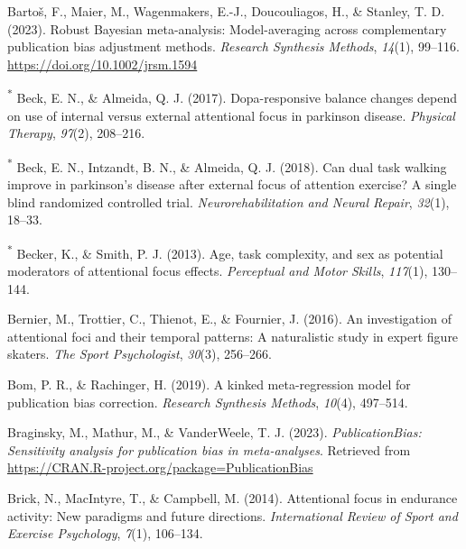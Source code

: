 \documentclass[
  man, donotrepeattitle,floatsintext]{apa7}
\newlength{\cslhangindent}
\newlength{\cslentryspacingunit} %
\newenvironment{CSLReferences}[2] %
 {%
  \setlength{\parindent}{0pt}
  \ifodd #1
  \let\oldpar\par
  \def\par{\hangindent=\cslhangindent\oldpar}
  \fi
  \setlength{\parskip}{#2\cslentryspacingunit}
 }%
 {}
\begin{document}
\begin{CSLReferences}{1}{0}
\leavevmode{}%
Bartoš, F., Maier, M., Wagenmakers, E.-J., Doucouliagos, H., \& Stanley, T. D. (2023). Robust {Bayesian} meta-analysis: {Model-averaging} across complementary publication bias adjustment methods. \emph{Research Synthesis Methods}, \emph{14}(1), 99--116. \url{https://doi.org/10.1002/jrsm.1594}

\leavevmode{}%
\textsuperscript{*} Beck, E. N., \& Almeida, Q. J. (2017). Dopa-responsive balance changes depend on use of internal versus external attentional focus in parkinson disease. \emph{Physical Therapy}, \emph{97}(2), 208--216.

\leavevmode{}%
\textsuperscript{*} Beck, E. N., Intzandt, B. N., \& Almeida, Q. J. (2018). Can dual task walking improve in parkinson's disease after external focus of attention exercise? A single blind randomized controlled trial. \emph{Neurorehabilitation and Neural Repair}, \emph{32}(1), 18--33.

\leavevmode{}%
\textsuperscript{*} Becker, K., \& Smith, P. J. (2013). Age, task complexity, and sex as potential moderators of attentional focus effects. \emph{Perceptual and Motor Skills}, \emph{117}(1), 130--144.

\leavevmode{}%
Bernier, M., Trottier, C., Thienot, E., \& Fournier, J. (2016). An investigation of attentional foci and their temporal patterns: A naturalistic study in expert figure skaters. \emph{The Sport Psychologist}, \emph{30}(3), 256--266.

\leavevmode{}%
Bom, P. R., \& Rachinger, H. (2019). A kinked meta-regression model for publication bias correction. \emph{Research Synthesis Methods}, \emph{10}(4), 497--514.

\leavevmode{}%
Braginsky, M., Mathur, M., \& VanderWeele, T. J. (2023). \emph{PublicationBias: Sensitivity analysis for publication bias in meta-analyses}. Retrieved from \url{https://CRAN.R-project.org/package=PublicationBias}

\leavevmode{}%
Brick, N., MacIntyre, T., \& Campbell, M. (2014). Attentional focus in endurance activity: New paradigms and future directions. \emph{International Review of Sport and Exercise Psychology}, \emph{7}(1), 106--134.


\end{CSLReferences}
\end{document}

